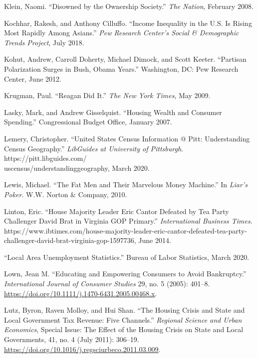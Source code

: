 \documentclass[12pt,oneside]{psthesis}
\begin{document}
\leavevmode\hypertarget{ref-klein2008disowned}{}%
Klein, Naomi. ``Disowned by the Ownership Society.'' \emph{The Nation}, February 2008.

\leavevmode\hypertarget{ref-kochhar2018income}{}%
Kochhar, Rakesh, and Anthony Cilluffo. ``Income Inequality in the U.S. Is Rising Most Rapidly Among Asians.'' \emph{Pew Research Center's Social \& Demographic Trends Project}, July 2018.

\leavevmode\hypertarget{ref-kohut2012partisan}{}%
Kohut, Andrew, Carroll Doherty, Michael Dimock, and Scott Keeter. ``Partisan Polarization Surges in Bush, Obama Years.'' Washington, DC: Pew Research Center, June 2012.

\leavevmode\hypertarget{ref-krugman2009reagan}{}%
Krugman, Paul. ``Reagan Did It.'' \emph{The New York Times}, May 2009.

\leavevmode\hypertarget{ref-lasky2007housing}{}%
Lasky, Mark, and Andrew Gisselquist. ``Housing Wealth and Consumer Spending.'' Congressional Budget Office, January 2007.

\leavevmode\hypertarget{ref-lemery2020united}{}%
Lemery, Christopher. ``United States Census Information @ Pitt: Understanding Census Geography.'' \emph{LibGuides at University of Pittsburgh}. https://pitt.libguides.com/\\uscensus/understandinggeography, March 2020.

\leavevmode\hypertarget{ref-lewis2010fat}{}%
Lewis, Michael. ``The Fat Men and Their Marvelous Money Machine.'' In \emph{Liar's Poker}. W.W. Norton \& Company, 2010.

\leavevmode\hypertarget{ref-linton2014house}{}%
Linton, Eric. ``House Majority Leader Eric Cantor Defeated by Tea Party Challenger David Brat in Virginia GOP Primary.'' \emph{International Business Times}. https://www.ibtimes.com/house-majority-leader-eric-cantor-defeated-tea-party-\\challenger-david-brat-virginia-gop-1597736, June 2014.

\leavevmode\hypertarget{ref-2020local}{}%
``Local Area Unemployment Statistics.'' Bureau of Labor Statistics, March 2020.

\leavevmode\hypertarget{ref-lown2005educating}{}%
Lown, Jean M. ``Educating and Empowering Consumers to Avoid Bankruptcy.'' \emph{International Journal of Consumer Studies} 29, no. 5 (2005): 401--8. \url{https://doi.org/10.1111/j.1470-6431.2005.00468.x}.

\leavevmode\hypertarget{ref-lutz2011housing}{}%
Lutz, Byron, Raven Molloy, and Hui Shan. ``The Housing Crisis and State and Local Government Tax Revenue: Five Channels.'' \emph{Regional Science and Urban Economics}, Special Issue: The Effect of the Housing Crisis on State and Local Governments, 41, no. 4 (July 2011): 306--19. \url{https://doi.org/10.1016/j.regsciurbeco.2011.03.009}.
\end{document}
